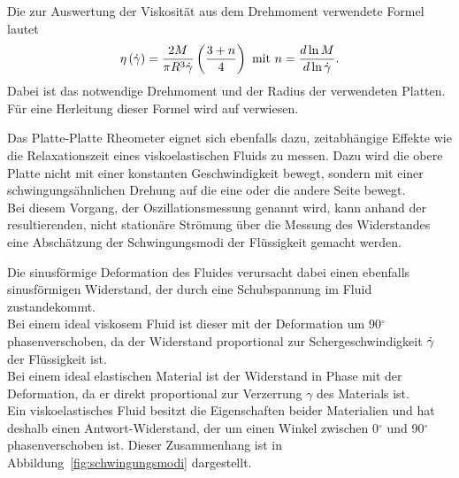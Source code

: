 Die zur Auswertung der Viskosität aus dem Drehmoment verwendete Formel lautet
\begin{equation}
    \label{eq:platterheovisko}
    \eta\left( \dot\gamma \right) = \frac{2M}{\pi R^3 \dot\gamma}\left( \frac{3+n}{4} \right) \text{ mit } n=\frac{d\ln M}{d\ln\dot\gamma}.
\end{equation}
Dabei ist  das notwendige Drehmoment und  der Radius der verwendeten Platten.
Für eine Herleitung dieser Formel wird auf \cite{introtorheo} verwiesen.

Das Platte-Platte Rheometer eignet sich ebenfalls dazu, zeitabhängige Effekte wie die Relaxationszeit eines viskoelastischen Fluids zu messen.
Dazu wird die obere Platte nicht mit einer konstanten Geschwindigkeit bewegt, sondern mit einer schwingungsähnlichen Drehung auf die eine oder die andere Seite bewegt.\\
Bei diesem Vorgang, der Oszillationsmessung genannt wird, kann anhand der resultierenden, nicht stationäre Strömung über die Messung des Widerstandes eine Abschätzung der Schwingungsmodi der Flüssigkeit gemacht werden.

Die sinusförmige Deformation  des Fluides verursacht dabei einen ebenfalls sinusförmigen Widerstand, der durch eine Schubspannung  im Fluid zustandekommt.\\
Bei einem ideal viskosem Fluid ist dieser mit der Deformation um 90$^\circ$ phasenverschoben, da der Widerstand proportional zur Schergeschwindigkeit $\dot\gamma$ der Flüssigkeit ist.\\
Bei einem ideal elastischen Material ist der Widerstand in Phase mit der Deformation, da er direkt proportional zur Verzerrung $\gamma$ des Materials ist.\\
Ein viskoelastisches Fluid besitzt die Eigenschaften beider Materialien und hat deshalb einen Antwort-Widerstand, der um einen Winkel zwischen 0$^\circ$ und 90$^\circ$ phasenverschoben ist. Dieser Zusammenhang ist in Abbildung~\ref{fig:schwingungsmodi} dargestellt.

